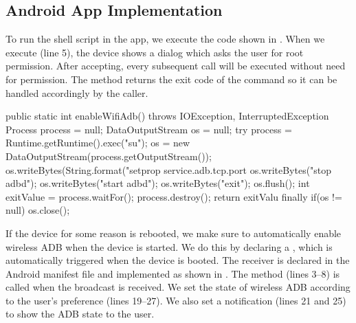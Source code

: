 
\subsection{Android App Implementation}
To run the shell script in the app, we execute the code shown in . When we execute  (line 5), the device shows a dialog which asks the user for root permission. After accepting, every subsequent  call will be executed without need for permission. The method returns the exit code of the command so it can be handled accordingly by the caller.
\begin{javacode}[float,label=lst:android_app_shell,caption=Enable wireless ADB in Android]
public static int enableWifiAdb() throws IOException, InterruptedException {
  Process process = null;
  DataOutputStream os = null;
  try {
    process = Runtime.getRuntime().exec("su");
    os = new DataOutputStream(process.getOutputStream());
    os.writeBytes(String.format("setprop service.adb.tcp.port %
    os.writeBytes("stop adbd\n");
    os.writeBytes("start adbd\n");
    os.writeBytes("exit\n");
    os.flush();
    int exitValue = process.waitFor();
    process.destroy();
    return exitValu
  } finally {
    if(os != null) {
      os.close();
    }
  }
}
\end{javacode}
If the device for some reason is rebooted, we make sure to automatically enable wireless ADB when the device is started. We do this by declaring a , which is automatically triggered when the device is booted. The receiver is declared in the Android manifest file and implemented as shown in . The  method (lines 3--8) is called when the broadcast is received. We set the state of wireless ADB according to the user's preference (lines 19--27). We also set a notification (lines 21 and 25) to show the ADB state to the user.

